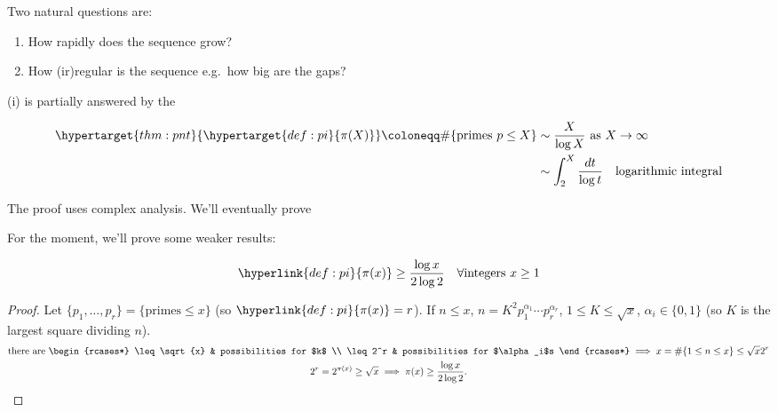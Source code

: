 \documentclass{article}
\begin{document}
Two natural questions are:
\begin{enumerate}[label=(\roman*)]
    \item How rapidly does the sequence grow?
    \item How (ir)regular is the sequence e.g.\ how big are the gaps?
\end{enumerate}

(i) is partially answered by the
\begin{thm}
    \begin{align*}
        \hypertarget{thm:pnt}{\hypertarget{def:pi}{\pi(X)}} \coloneqq \#\{\text{primes } p \leq X\} &\sim \frac{X}{\log X} \text{ as } X \to \infty \\
                                               &\sim \int_2^X \frac{dt}{\log t} \quad \text{logarithmic integral}
    \end{align*}
\end{thm}
The proof uses complex analysis.
We'll eventually prove
For the moment, we'll prove some weaker results:
\begin{nlemma}\label{lem:5.1}
    \begin{equation*}
        \hyperlink{def:pi}{\pi(x)} \geq \frac{\log x}{2 \log 2} \quad \forall \text{integers } x \geq 1
    \end{equation*}
\end{nlemma}

\begin{proof}
    Let $\{p_1, \dotsc, p_r\} = \{\text{primes} \leq x\}$ (so $\hyperlink{def:pi}{\pi(x)} = r$).
    If $n \leq x$, $n = K^2 p_1^{\alpha_1} \dotsm p_r^{\alpha_r}$, $1 \leq K \leq \sqrt{x}$, $\alpha_i \in \{0, 1\}$ (so $K$ is the largest square dividing $n$).
    \begin{gather*}
        \text{there are }
        \begin{rcases*}
            \leq \sqrt{x} & possibilities for $k$ \\
            \leq 2^r & possibilities for $\alpha_i$s
        \end{rcases*}
        \implies x = \#\{1 \leq n \leq x\} \leq \sqrt{x} 2^r \\
        2^r = 2^{\pi(x)} \geq \sqrt{x} \implies \pi(x) \geq \frac{\log{x}}{2 \log 2}. \qedhere
    \end{gather*}
\end{proof}
\end{document}
